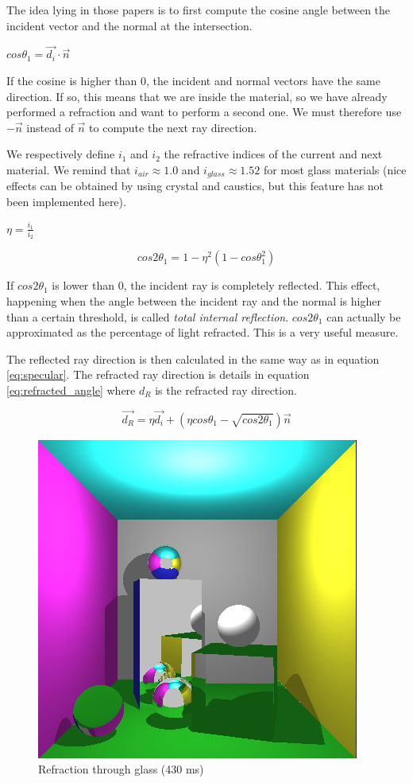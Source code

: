 The idea lying in those papers is to first compute the cosine angle between the incident vector and the normal at the intersection.

$ cos\theta_1 = \vec{d_i} \cdot \vec{n} $

If the cosine is higher than 0, the incident and normal vectors have the same direction. If so, this means that we are inside the material, so we have already performed a refraction and want to perform a second one. We must therefore use $-\vec{n}$ instead of $\vec{n}$ to compute the next ray direction.

We respectively define $i_1$ and $i_2$ the refractive indices of the current and next material. We remind that $i_{air} \approx 1.0$ and $i_{glass} \approx 1.52$ for most glass materials (nice effects can be obtained by using crystal and caustics, but this feature has not been implemented here).

$\eta = \frac{i_1}{i_2}$

\begin{equation}
cos2\theta_1 = 1 - \eta^2 (1 - cos\theta_1^2)
\label{eq:refraction_percent}
\end{equation}

If $cos2\theta_1$ is lower than 0, the incident ray is completely reflected. This effect, happening when the angle between the incident ray and the normal is higher than a certain threshold, is called \textit{total internal reflection}. $cos2\theta_1$ can actually be approximated as the percentage of light refracted. This is a very useful measure.

The reflected ray direction is then calculated in the same way as in equation \ref{eq:specular}. The refracted ray direction is details in equation \ref{eq:refracted_angle} where $d_R$ is the refracted ray direction.

\begin{equation}
\vec{d_R} = \eta \vec{d_i} + (\eta cos\theta_1 - \sqrt{cos2\theta_1}) \vec{n}
\label{eq:refracted_angle}
\end{equation}

\begin{figure}[H]
\centering
\includegraphics[width=0.35\linewidth]{img/glass_refraction.jpg}
\caption{Refraction through glass (430 ms)}
\label{fig:glass_refraction}
\end{figure}

